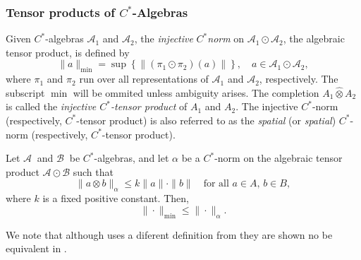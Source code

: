 \subsubsection{Tensor products of $C^*$-Algebras}


\begin{definition} \label{def:min_tensor_c*}
  Given $C^*$-algebras $\mathscr{A}_1$ and $\mathscr{A}_2$, the \emph{injective} $C^*$\emph{norm} on $\mathscr{A}_1 \odot \mathscr{A}_2$, the algebraic tensor product, is defined by
\[
\|a\|_{\min} = \sup \left\{ \|(\pi_1 \odot \pi_2)(a)\| \right\},
\quad a \in \mathscr{A}_1 \odot \mathscr{A}_2,
\]
where $\pi_1$ and $\pi_2$ run over all  representations of $\mathscr{A}_1$ and $\mathscr{A}_2$, respectively. The subscript $\min$  will be ommited unless ambiguity arises.
The completion $A_1 \widehat{\otimes} A_2$ is called the \emph{injective $C^*$-tensor product} of $A_1$ and $A_2$. The injective  $C^*$-norm (respectively, $C^*$-tensor product) is also referred to as the \emph{spatial} (or \emph{spatial}) $C^*$-norm (respectively, $C^*$-tensor product).
\end{definition}

\begin{proposition} \cite[Proposition 1.22.7]{sakaiCAlgebrasWAlgebras1998} \label{prop:sakai_tensor_min}
  Let \( \mathscr{A}\ \) and \( \mathscr{B}\ \) be \( C^* \)-algebras, and let \( \alpha \) be a \( C^* \)-norm on the algebraic tensor product \( \mathscr{A} \odot \mathscr{B} \) such that
\[
\|a \otimes b\|_{\alpha} \leq k \|a\| \cdot \|b\| \quad \text{for all } a \in A,\, b \in B,
\]
where \( k \) is a fixed positive constant.
Then,
\[
\|\cdot\|_{\min} \leq \|\cdot\|_{\alpha}.
\]
\end{proposition}

We note that although \cite{sakaiCAlgebrasWAlgebras1998} uses a diferent definition from \cite{takesakiTheoryOperatorAlgebras1979} they are shown no be equivalent in \cite[Theorem 4.9]{takesakiTheoryOperatorAlgebras1979}.







